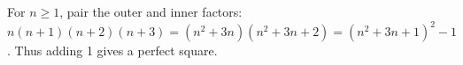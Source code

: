 For $n\ge1$, pair the outer and inner factors: $n(n+1)(n+2)(n+3)=(n^2+3n)(n^2+3n+2)=(n^2+3n+1)^2-1$. Thus adding 1 gives a perfect square.
